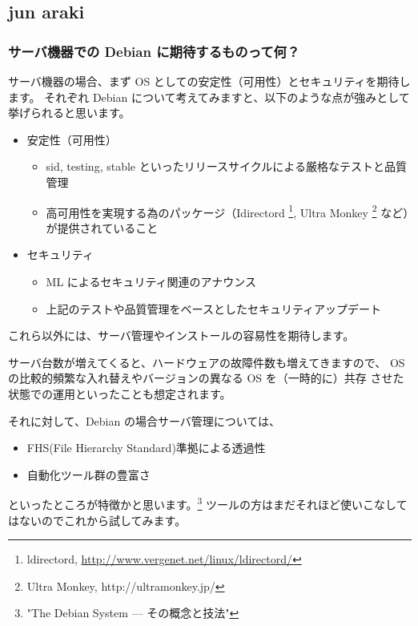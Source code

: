 \documentclass[mingoth,a4paper]{jsarticle}
\begin{document}
\subsection{jun araki}
\subsubsection{サーバ機器での Debian に期待するものって何？}

サーバ機器の場合、まず OS としての安定性（可用性）とセキュリティを期待します。
それぞれ Debian について考えてみますと、以下のような点が強みとして挙げられると思います。

\begin{itemize}
 \item  安定性（可用性）
	\begin{itemize}
 \item  sid, testing, stable といったリリースサイクルによる厳格なテストと品質管理
 \item  高可用性を実現する為のパッケージ（Idirectord
 \footnote{ldirectord, \url{http://www.vergenet.net/linux/ldirectord/}},
  Ultra Monkey
 \footnote{Ultra Monkey, http://ultramonkey.jp/} など）が提供されていること
	\end{itemize}

 \item  セキュリティ
\begin{itemize}
 \item  ML によるセキュリティ関連のアナウンス
 \item  上記のテストや品質管理をベースとしたセキュリティアップデート
\end{itemize}
\end{itemize}
 これら以外には、サーバ管理やインストールの容易性を期待します。

 サーバ台数が増えてくると、ハードウェアの故障件数も増えてきますので、
 OS の比較的頻繁な入れ替えやバージョンの異なる OS を（一時的に）共存
 させた状態での運用といったことも想定されます。

 それに対して、Debian の場合サーバ管理については、

\begin{itemize}
 \item  FHS(File Hierarchy Standard)準拠による透過性
 \item  自動化ツール群の豊富さ
\end{itemize}

といったところが特徴かと思います。\footnote{"The Debian System --- その概念と技法"}
ツールの方はまだそれほど使いこなしてはないのでこれから試してみます。
\end{document}
